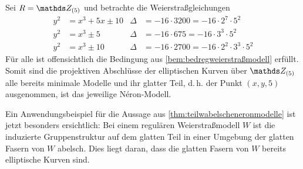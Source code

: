 \begin{Beispiel}
  Sei $R=\Z_{(5)}$ und betrachte die Weierstraßgleichungen
  \begin{align*}
    y^2&=x^3+5x\pm 10
    & \Delta&=-16\cdot3200=-16\cdot2^7\cdot5^2\\
    y^2&=x^3\pm 5
    & \Delta&=-16\cdot675=-16\cdot3^3\cdot5^2\\
    y^2&=x^3\pm 10
    & \Delta&=-16\cdot2700=-16\cdot2^2\cdot3^3\cdot5^2
  \end{align*}
  Für alle ist offensichtlich die Bedingung aus
  \ref{bem:bedregweierstraßmodell} erfüllt.
  Somit sind die projektiven Abschlüsse der elliptischen Kurven über
  $\Z_{(5)}$ alle bereits minimale Modelle und ihr glatter Teil,
  d.\,h. der Punkt $(x,y,5)$ ausgenommen, ist das jeweilige
  Néron-Modell.
\end{Beispiel}

\begin{Beispiel}
  Ein Anwendungsbeispiel für die Aussage aus
  \ref{thm:teilwabelscheneronmodelle} ist jetzt besonders ersichtlich:
  Bei einem regulären Weierstraßmodell $W$ ist die induzierte
  Gruppenstruktur auf dem glatten Teil in einer Umgebung der glatten
  Fasern von $W$ abelsch.
  Dies liegt daran, dass die glatten Fasern von $W$ bereits
  elliptische Kurven sind.
\end{Beispiel}

